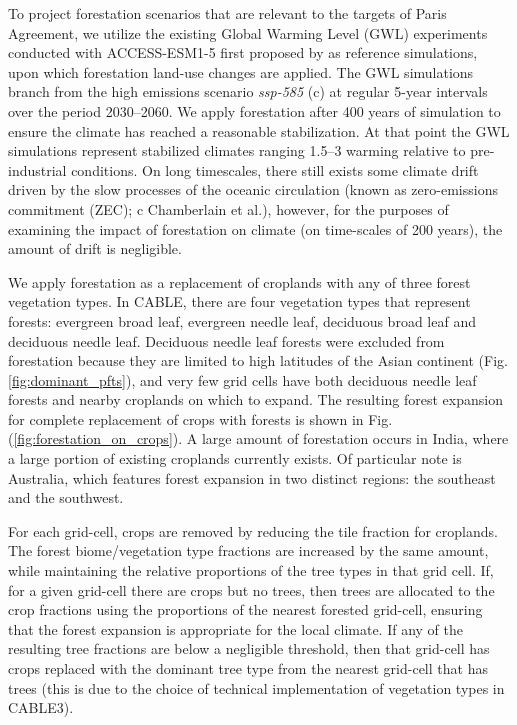 \documentclass[]{article}
\begin{document}
To project forestation scenarios that are relevant to the targets of Paris Agreement, we utilize the existing Global Warming Level (GWL) experiments conducted with ACCESS-ESM1-5 first proposed by \cite{king_studying_2021} as reference simulations, upon which forestation land-use changes are applied. The GWL simulations branch from the high emissions scenario \textit{ssp-585} (c) at regular 5-year intervals over the period 2030–2060. We apply forestation after 400 years of simulation to ensure the climate has reached a reasonable stabilization. At that point the GWL simulations represent stabilized climates ranging 1.5–3 \textcelsius warming relative to pre-industrial conditions. On long timescales, there still exists some climate drift driven by the slow processes of the oceanic circulation (known as zero-emissions commitment (ZEC); c Chamberlain et al.), however, for the purposes of examining the impact of forestation on climate (on time-scales of 200 years), the amount of drift is negligible.

We apply forestation as a replacement of croplands with any of three forest vegetation types.
In CABLE, there are four vegetation types that represent forests: evergreen broad leaf, evergreen needle leaf, deciduous broad leaf and deciduous needle leaf.
Deciduous needle leaf forests were excluded from forestation because they are limited to high latitudes of the Asian continent (Fig. \ref{fig:dominant_pfts}), and very few grid cells have both deciduous needle leaf forests and nearby croplands on which to expand.
The resulting forest expansion for complete replacement of crops with forests is shown in Fig. (\ref{fig:forestation_on_crops}).
A large amount of forestation occurs in India, where a large portion of existing croplands currently exists.
Of particular note is Australia, which features forest expansion in two distinct regions: the southeast and the southwest.

For each grid-cell, crops are removed by reducing the tile fraction for croplands.
The forest biome/vegetation type fractions are increased by the same amount, while maintaining the relative proportions of the tree types in that grid cell.
If, for a given grid-cell there are crops but no trees, then trees are allocated to the crop fractions using the proportions of the nearest forested grid-cell, ensuring that the forest expansion is appropriate for the local climate.
If any of the resulting tree fractions are below a negligible threshold, then that grid-cell has crops replaced with the dominant tree type from the nearest grid-cell that has trees (this is due to the choice of technical implementation of vegetation types in CABLE3).
\end{document}
